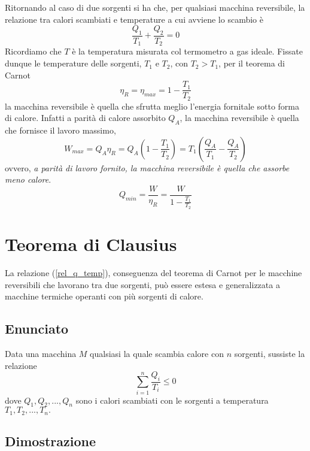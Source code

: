 \documentclass[class=book, crop=false, oneside, 12pt]{standalone}
\begin{document}
Ritornando al caso di due sorgenti si ha che, per qualsiasi macchina reversibile, la relazione tra calori scambiati e temperature a cui avviene lo scambio è
\begin{equation} \label{rel_q_temp}
    \frac{Q_1}{T_1} + \frac{Q_2}{T_2} = 0
\end{equation}
Ricordiamo che \(T\) è la temperatura misurata col termometro a gas ideale. 
Fissate dunque le temperature delle sorgenti, \(T_1\) e \(T_2\), con \(T_2 > T_1\), per il teorema di Carnot
\begin{equation}
    \eta_R = \eta_{max} = 1- \frac{T_1}{T_2}
\end{equation}
la macchina reversibile è quella che sfrutta meglio l'energia fornitale sotto forma di calore.
Infatti a parità di calore assorbito \(Q_A\), la macchina reversibile è quella che fornisce il lavoro massimo, 
\begin{equation}
    W_{max} = Q_A \eta_R = Q_A \left(1 - \frac{T_1}{T_2}\right) = T_1 \left(\frac{Q_A}{T_1} - \frac{Q_A}{T_2}\right)
\end{equation}
ovvero, \emph{a parità di lavoro fornito, la macchina reversibile è quella che assorbe meno calore}.
\begin{equation}
    Q_{min} = \frac{W}{\eta_R} = \frac{W}{1- \frac{T_1}{T_2}}
\end{equation}

\section{Teorema di Clausius}

La relazione (\ref{rel_q_temp}), conseguenza del teorema di Carnot per le macchine reversibili che lavorano tra due sorgenti, può essere estesa e generalizzata a macchine termiche operanti con più sorgenti di calore. 

\subsection{Enunciato}

Data una macchina \(M\) qualsiasi la quale scambia calore con \(n\) sorgenti, sussiste la relazione 
\begin{equation} \label{enunciato_teorema_clausius}
    \sum_{i = 1}^{n} \frac{Q_i}{T_i} \leq 0
\end{equation}
dove \(Q_1, Q_2, ... , Q_n\) sono i calori scambiati con le sorgenti a temperatura \(T_1, T_2, ... , T_n.\)

\subsection{Dimostrazione}
\end{document}

